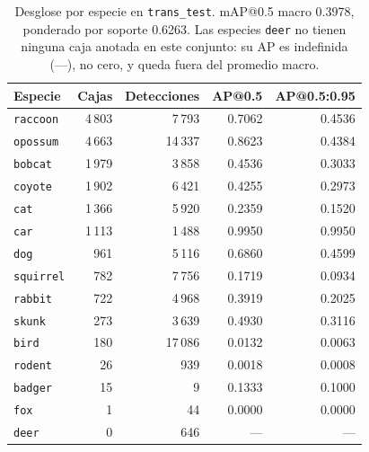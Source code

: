 \begin{table}[t]
  \centering
  \small
  \begin{tabular}{lrrrr}
    \toprule
    Especie & Cajas & Detecciones & AP@0.5 & AP@0.5:0.95 \\
    \midrule
    \texttt{raccoon} & 4\,803 & 7\,793 & 0.7062 & 0.4536 \\
    \texttt{opossum} & 4\,663 & 14\,337 & 0.8623 & 0.4384 \\
    \texttt{bobcat} & 1\,979 & 3\,858 & 0.4536 & 0.3033 \\
    \texttt{coyote} & 1\,902 & 6\,421 & 0.4255 & 0.2973 \\
    \texttt{cat} & 1\,366 & 5\,920 & 0.2359 & 0.1520 \\
    \texttt{car} & 1\,113 & 1\,488 & 0.9950 & 0.9950 \\
    \texttt{dog} & 961 & 5\,116 & 0.6860 & 0.4599 \\
    \texttt{squirrel} & 782 & 7\,756 & 0.1719 & 0.0934 \\
    \texttt{rabbit} & 722 & 4\,968 & 0.3919 & 0.2025 \\
    \texttt{skunk} & 273 & 3\,639 & 0.4930 & 0.3116 \\
    \texttt{bird} & 180 & 17\,086 & 0.0132 & 0.0063 \\
    \texttt{rodent} & 26 & 939 & 0.0018 & 0.0008 \\
    \texttt{badger} & 15 & 9 & 0.1333 & 0.1000 \\
    \texttt{fox} & 1 & 44 & 0.0000 & 0.0000 \\
    \texttt{deer} & 0 & 646 & --- & --- \\
    \bottomrule
  \end{tabular}
  \caption{Desglose por especie en \texttt{trans\_test}. mAP@0.5 macro 0.3978, ponderado por soporte 0.6263. Las especies \texttt{deer} no tienen ninguna caja anotada en este conjunto: su AP es indefinida (---), no cero, y queda fuera del promedio macro.}
  \label{tab:especies_trans_test}
\end{table}
